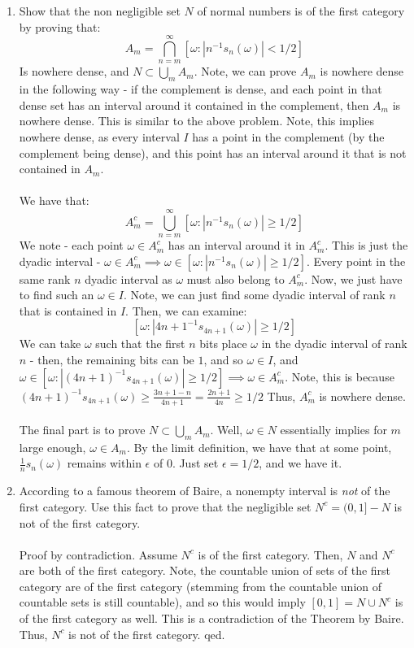 \documentclass[12pt,a4paper]{article}
\newcommand{\1}[1]{\mathbbm{1}\left\{ #1 \right\}}
\begin{document}
\begin{enumerate}
	\item Show that the non negligible set $N$ of normal numbers is of the first category by proving that:
	$$
		A_m = \bigcap_{n = m}^\infty \left[\omega: |n^{-1}s_n(\omega)| < 1/2\right]
	$$
	Is nowhere dense, and $N \subset \bigcup_m A_m$. Note, we can prove $A_m$ is nowhere dense in the following way - if the complement is dense, and each point in that dense set has an interval around it contained in the complement, then $A_m$ is nowhere dense. This is similar to the above problem. Note, this implies nowhere dense, as every interval $I$ has a point in the complement (by the complement being dense), and this point has an interval around it that is not contained in $A_m$.
	\\\\
	We have that:
	$$
		A_m^c = \bigcup_{n=m}^\infty \left[\omega: |n^{-1}s_n(\omega)| \geq 1/2\right]
	$$
	We note - each point $\omega \in A_m^c$ has an interval around it in $A_m^c$. This is just the dyadic interval - $\omega \in A_m^c \implies \omega \in \left[\omega: |n^{-1}s_n(\omega)| \geq 1/2\right]$. Every point in the same rank $n$ dyadic interval as $\omega$ must also belong to $A_m^c$. Now, we just have to find such an $\omega \in I$. Note, we can just find some dyadic interval of rank $n$ that is contained in $I$. Then, we can examine:
	$$
		\left[\omega: |{4n+1}^{-1}s_{4n + 1}(\omega)| \geq 1/2\right]
	$$
	We can take $\omega$ such that the first $n$ bits place $\omega$ in the dyadic interval of rank $n$ - then, the remaining bits can be $1$, and so $\omega \in I$, and $\omega \in \left[\omega: |(4n+1)^{-1}s_{4n + 1}(\omega)| \geq 1/2\right] \implies \omega \in A_m^c$. Note, this is because $(4n+1)^{-1}s_{4n + 1}(\omega) \geq \frac{3n + 1 - n}{4n + 1} = \frac{2n + 1}{4n} \geq 1/2$ Thus, $A_m^c$ is nowhere dense.
	\\\\
	The final part is to prove $N \subset \bigcup_m A_m$. Well, $\omega \in N$ essentially implies for $m$ large enough, $\omega \in A_m$. By the limit definition, we have that at some point, $\frac{1}{n}s_n(\omega)$ remains within $\epsilon$ of $0$. Just set $\epsilon = 1/2$, and we have it.
	
	\item According to a famous theorem of Baire, a nonempty interval is \textit{not} of the first category. Use this fact to prove that the negligible set $N^c = (0,1] - N$ is not of the first category.
	\\\\
	Proof by contradiction. Assume $N^c$ is of the first category. Then, $N$ and $N^c$ are both of the first category. Note, the countable union of sets of the first category are of the first category (stemming from the countable union of countable sets is still countable), and so this would imply $[0,1] = N \cup N^c$ is of the first category as well. This is a contradiction of the Theorem by Baire. Thus, $N^c$ is not of the first category. qed.
\end{enumerate}
\end{document}
